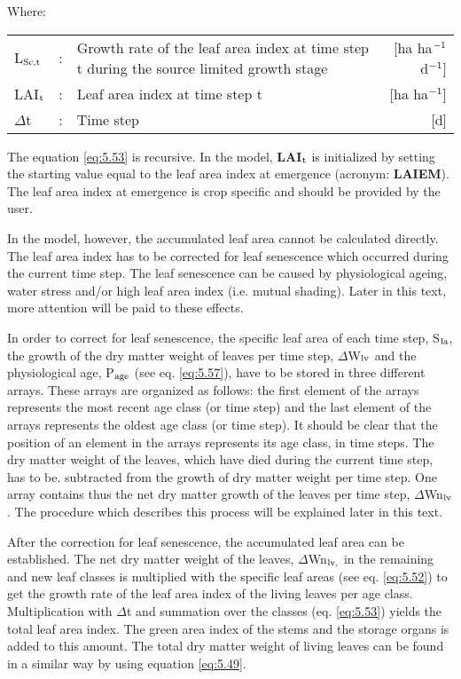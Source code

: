 Where:\\[5pt]
\begin{tabularx}{\textwidth}{llXr}
	L$_{{\rm Sc,t}}$ &:& Growth rate of the leaf area index at time step t
	during the source limited growth stage     &   [ha ha$^{{\rm -1}}$ d$^{{\rm -1}}$]\\
	LAI$_{{\rm t}}$ &:& Leaf area index at time step t     &
	[ha ha$^{{\rm -1}}$]\\
	$\Delta$t &:& Time step    &    [d]\\
\end{tabularx}

The equation \ref{eq:5.53} is recursive. In the model, {\bf LAI$_{{\rm t}}$} is initialized by 
setting the starting
value equal to the leaf area index at emergence (acronym: {\bf LAIEM}). The leaf area index
at emergence is crop specific and should be provided by the user.

In the model, however, the accumulated leaf area cannot be calculated directly. The leaf
area index has to be corrected for leaf senescence which occurred during the current time
step. The leaf senescence can be caused by physiological ageing, water stress and/or high
leaf area index (i.e. mutual shading). Later in this text, more attention will be paid to
these effects.

In order to correct for leaf senescence, the specific leaf area of each time step, S$_{{\rm la}}$, the
growth of the dry matter weight of leaves per time step, $\Delta$W$_{{\rm lv}}$ and the physiological age,
P$_{{\rm age}}$ (see eq. \ref{eq:5.57}), have to be stored in three different arrays. These arrays are organized
as follows: the first element of the arrays represents the most recent age class (or time
step) and the last element of the arrays represents the oldest age class (or time step). It
should be clear that the position of an element in the arrays represents its age class, in
time steps. The dry matter weight of the leaves, which have died during the current time
step, has to be. subtracted from the growth of dry matter weight per time step. One array
contains thus the net dry matter growth of the leaves per time step, $\Delta$Wn$_{{\rm lv}}$. 
The procedure which describes this process will be explained later in this text. 

After the correction for leaf senescence, the accumulated leaf area can be established. The
net dry matter weight of the leaves, $\Delta$Wn$_{{\rm lv,}}$  in the remaining and new leaf classes is
multiplied with the specific leaf areas (see eq. \ref{eq:5.52}) to get the growth rate of the leaf area
index of the living leaves per age class. Multiplication with $\Delta$t and summation over the
classes (eq. \ref{eq:5.53}) yields the total leaf area index. The green area index of the stems and
the storage organs is added to this amount. The total dry matter weight of living leaves
can be found in a similar way by using equation \ref{eq:5.49}.

